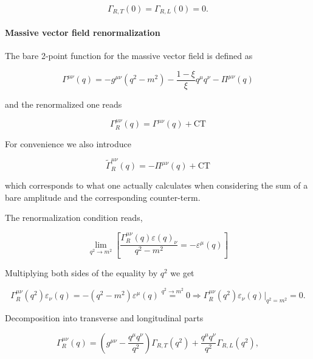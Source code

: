 \documentclass[../FeynCalcManual.tex]{subfiles}
\begin{document}
\begin{equation}
    \Gamma_{R,T} (0) = \Gamma_{R,L} (0) = 0.
\end{equation}

\hypertarget{massive-vector-field-renormalization}{%
\paragraph{Massive vector field
renormalization}\label{massive-vector-field-renormalization}}

The bare 2-point function for the massive vector field is defined as

\begin{equation}
    \Gamma^{\mu \nu} (q) = -g^{\mu \nu} (q^2 - m^2) - \frac{1-\xi}{\xi} q^{\mu} q^{\nu}  - \Pi^{\mu \nu} (q)
\end{equation}

and the renormalized one reads

\begin{equation}
    \Gamma_R^{\mu \nu} (q) = \Gamma^{\mu \nu} (q) + \text{CT}
\end{equation}

For convenience we also introduce

\begin{equation}
    \tilde{\Gamma}^{\mu \nu}_R(q) = - \Pi^{\mu \nu} (q) + \text{CT}
\end{equation}

which corresponds to what one actually calculates when considering the
sum of a bare amplitude and the corresponding counter-term.

The renormalization condition reads,

\begin{equation}
    \lim_{q^2 \to m^2} \left [ \frac{\Gamma_R^{\mu \nu} (q) \varepsilon(q)_\nu}{q^2 - m^2}  = - \varepsilon^{\mu}(q) \right ]
\end{equation}

Multiplying both sides of the equality by \(q^2\) we get

\begin{equation}
    \Gamma_R^{\mu \nu} (q^2)   \varepsilon_\nu (q) = - (q^2 - m^2) \varepsilon^{\mu}(q) \overset{q^2 \to m^2}{=} 0 \Rightarrow \Gamma_R^{\mu \nu} (q^2) \varepsilon_\nu(q) \biggl|_{q^2=m^2}  = 0.
\end{equation}

Decomposition into transverse and longitudinal parts

\begin{equation}
    \Gamma_R^{\mu \nu} (q) = \left ( g^{\mu \nu} - \frac{q^\mu q^\nu}{q^2} \right ) \Gamma_{R,T} (q^2) + \frac{q^\mu q^\nu}{q^2} \Gamma_{R,L} (q^2),
\end{equation}
\end{document}
